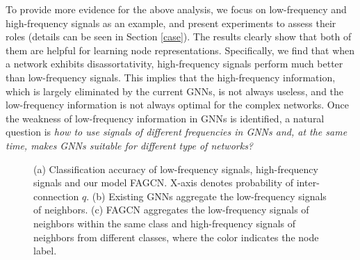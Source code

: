 \documentclass[letterpaper]{article} %
\begin{document}
To provide more evidence for the above analysis, we focus on low-frequency and high-frequency signals as an example, and present experiments to assess their roles (details can be seen in Section \ref{case}).
The results clearly show that both of them are helpful for learning node representations. Specifically, we find that when a network exhibits disassortativity, high-frequency signals perform much better than low-frequency signals.
This implies that the high-frequency information, which is largely eliminated by the current GNNs, is not always useless, and the low-frequency information is not always optimal for the complex networks.
Once the weakness of low-frequency information in GNNs is identified, a natural question is \emph{how to use signals of different frequencies in GNNs and, at the same time, makes GNNs suitable for different type of networks?}

\begin{figure}
\centering
{}
\caption{(a) Classification accuracy of low-frequency signals, high-frequency signals and our model FAGCN. X-axis denotes probability of inter-connection $q$. (b) Existing GNNs aggregate the low-frequency signals of neighbors. (c) FAGCN aggregates the low-frequency signals of neighbors within the same class and high-frequency signals of neighbors from different classes, where the color indicates the node label.}
\label{intro}
\end{figure}
\end{document}
